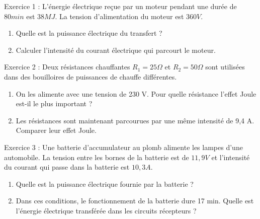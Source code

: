 \documentclass[12pt, french]{article}
\begin{document}
\begin{center}
\end{center}


   \begin{Box2}{Exercice 1 : }
L’énergie électrique reçue par un moteur pendant une durée de $80 min$ est $38 MJ$. La tension d’alimentation du
moteur est $360 V$.
      \begin{enumerate}
      \item Quelle est la puissance électrique du transfert ?

      \item  Calculer l’intensité du courant électrique qui parcourt le moteur.

         \end{enumerate}
   \end{Box2}


\begin{Box2}{Exercice 2 : }
Deux résistances chauffantes $R_1 =25 \Omega$ et $R_2 =50 \Omega$ sont utilisées dans des bouilloires de puissances de chauffe
différentes.
   \begin{enumerate}
   
      \item On les alimente avec une tension de 230 V. Pour quelle résistance l’effet Joule est-il le plus important ?

      \item  Les résistances sont maintenant parcourues par une même intensité de 9,4 A. Comparer leur effet Joule.

      \end{enumerate}
\end{Box2}

\begin{Box2}{Exercice 3 :}
Une batterie d’accumulateur au plomb alimente les lampes d’une automobile. La tension entre les bornes de la
batterie est de $11,9 V$ et l’intensité du courant qui passe dans la batterie est $10,3 A$.
   \begin{enumerate}

\item Quelle est la puissance électrique fournie par la batterie ?

\item Dans ces conditions, le fonctionnement de la batterie dure 17 min. Quelle est l’énergie électrique transférée
dans les circuits récepteurs ? 
   \end{enumerate}
   \end{Box2}
\end{document}
